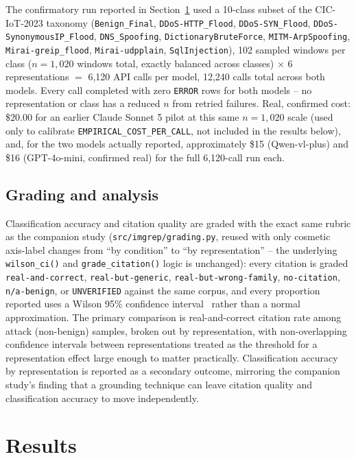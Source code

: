 \documentclass[11pt]{article}
\begin{document}
The confirmatory run reported in Section~\ref{sec:results} used a 10-class subset of the CIC-IoT-2023
taxonomy (\texttt{Benign\_Final}, \texttt{DDoS-HTTP\_Flood}, \texttt{DDoS-SYN\_Flood},
\texttt{DDoS-SynonymousIP\_Flood}, \texttt{DNS\_Spoofing}, \texttt{DictionaryBruteForce},
\texttt{MITM-ArpSpoofing}, \texttt{Mirai-greip\_flood}, \texttt{Mirai-udpplain},
\texttt{SqlInjection}), 102 sampled windows per class ($n=1{,}020$ windows total, exactly balanced
across classes) $\times$ 6 representations $=$ 6,120 API calls per model, 12,240 calls total across
both models. Every call completed with zero \texttt{ERROR} rows for both models -- no representation
or class has a reduced $n$ from retried failures. Real, confirmed cost: \$20.00 for an earlier
Claude Sonnet 5 pilot at this same $n=1{,}020$ scale (used only to calibrate
\texttt{EMPIRICAL\_COST\_PER\_CALL}, not included in the results below), and, for the two models
actually reported, approximately \$15 (Qwen-vl-plus) and \$16 (GPT-4o-mini, confirmed real) for the
full 6,120-call run each.

\subsection{Grading and analysis}

Classification accuracy and citation quality are graded with the exact same rubric as the companion
study (\texttt{src/imgrep/grading.py}, reused with only cosmetic axis-label changes from
``by condition'' to ``by representation'' -- the underlying \texttt{wilson\_ci()} and
\texttt{grade\_citation()} logic is unchanged): every citation is graded
\texttt{real-and-correct}, \texttt{real-but-generic}, \texttt{real-but-wrong-family},
\texttt{no-citation}, \texttt{n/a-benign}, or \texttt{UNVERIFIED} against the same corpus, and every
proportion reported uses a Wilson 95\% confidence interval~\cite{wilson1927} rather than a normal
approximation. The primary comparison is real-and-correct citation rate among attack (non-benign)
samples, broken out by representation, with non-overlapping confidence intervals between
representations treated as the threshold for a representation effect large enough to matter
practically. Classification accuracy by representation is reported as a secondary outcome, mirroring
the companion study's finding that a grounding technique can leave citation quality and
classification accuracy to move independently.

\section{Results}
\label{sec:results}
\end{document}
